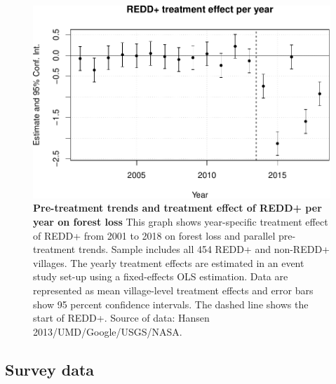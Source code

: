 \documentclass[
]{article}
\begin{document}
\begin{figure}[H]

{\centering \includegraphics{paper_REDD_replication_files/figure-latex/figEventStudy-1} 

}

\caption{\textbf{Pre-treatment trends and treatment effect of REDD+ per year on forest loss} This graph shows year-specific treatment effect of REDD+ from 2001 to 2018 on forest loss and parallel pre-treatment trends. Sample includes all 454 REDD+ and non-REDD+ villages. The yearly treatment effects are estimated in an event study set-up using a fixed-effects OLS estimation. Data are represented as mean village-level treatment effects and error bars show 95 percent confidence intervals. The dashed line shows the start of REDD+. Source of data: Hansen 2013/UMD/Google/USGS/NASA.}\label{fig:figEventStudy}
\end{figure}

\hypertarget{survey-data-1}{%
\subsection*{Survey data}\label{survey-data-1}}
\end{document}
